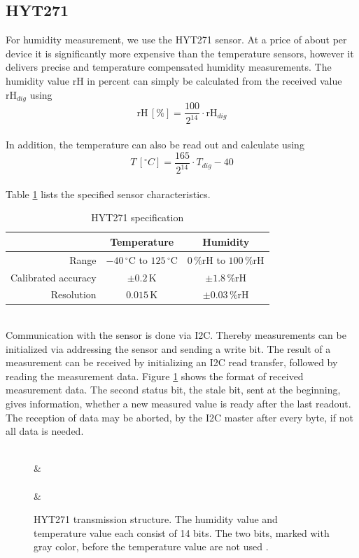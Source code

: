 \documentclass[a4paper]{scrreprt}
\begin{document}
\subsection{HYT271}
For humidity measurement, we use the HYT271 sensor. At a price of about  per device it is significantly more expensive than the temperature sensors, however it delivers precise and temperature compensated humidity measurements. 
The humidity value rH in percent can simply be calculated from the received value $\mathrm{rH}_{dig}$ using
$$\mathrm{rH}\,[\%] = \frac{100}{2^{14}} \cdot  \mathrm{rH}_{dig}$$\\
In addition, the temperature can also be read out and calculate using 
$$T\,[^{\circ} C] = \frac{165}{2^{14}} \cdot  T_{dig} - 40$$\\
Table \ref{tab:hyt} lists the specified sensor characteristics.
\begin{table}[Hh!]
	\centering
	\begin{tabular}{| r | c | c |}
		\hline
    &Temperature & Humidity\\
		\hline
		\hline
    Range & $-40\,^{\circ}\mathrm{C}$ to $125\,^{\circ}\mathrm{C}$ & $0\, \mathrm {\%rH}$ to $100\, \mathrm {\%rH}$\\
		\hline
    Calibrated accuracy & $\pm 0.2\,\mathrm{K}$ & $\pm 1.8\, \mathrm {\%rH}$   \\
		\hline
    Resolution & $0.015\,\mathrm{K}$ & $\pm 0.03\, \mathrm {\%rH}$ \\
		\hline
	\end{tabular}
  \caption{HYT271 specification \cite{hyt}}
	\label{tab:hyt}
\end{table}\\
Communication with the sensor is done via I2C. Thereby measurements can be initialized via addressing the sensor and sending a write bit. The result of a measurement can be received by initializing an I2C read transfer, followed by reading the measurement data. Figure \ref{fig:hyt_transmission} shows the format of received measurement data. The second status bit, the stale bit, sent at the beginning, gives information, whether a new measured value is ready after the last readout. The reception of data may be aborted, by the I2C master after every byte, if not all data is needed.
\begin{figure}[Hh!]
	\centering
	\begin{bytefield}[endianness=big, bitwidth=2.1em]{8}
		\\
     & \\
    \\
     & \\
	\end{bytefield}
  \caption{HYT271 transmission structure. The humidity value and temperature value each consist of 14 bits. The two bits, marked with gray color, before the temperature value are not used \cite{hyt2}.}
	\label{fig:hyt_transmission}
\end{figure}\\
\end{document}
